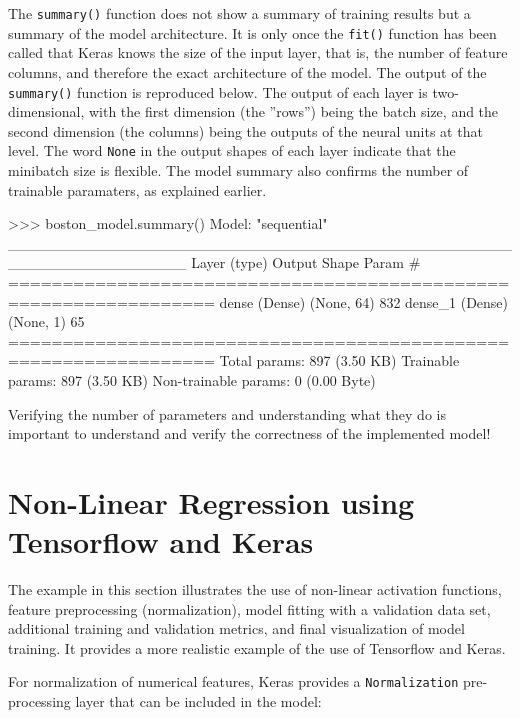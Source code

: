 \begin{withcode}
The \texttt{summary()} function does not show a summary of training results but a summary of the model architecture. It is only once the \texttt{fit()} function has been called that Keras knows the size of the input layer, that is, the number of feature columns, and therefore the exact architecture of the model. The output of the \texttt{summary()} function is reproduced below. The output of each layer is two-dimensional, with the first dimension (the ''rows'') being the batch size, and the second dimension (the columns) being the outputs of the neural units at that level. The word \texttt{None} in the output shapes of each layer indicate that the minibatch size is flexible. The model summary also confirms the number of trainable paramaters, as explained earlier.

\begin{textcode}
>>> boston_model.summary()
Model: "sequential"
_________________________________________________________________
 Layer (type)                Output Shape              Param #   
=================================================================
 dense (Dense)               (None, 64)                832       
 dense_1 (Dense)             (None, 1)                 65        
=================================================================
Total params: 897 (3.50 KB)
Trainable params: 897 (3.50 KB)
Non-trainable params: 0 (0.00 Byte)
\end{textcode}

\begin{alertbox}
Verifying the number of parameters and understanding what they do is important to understand and verify the correctness of the implemented model!
\end{alertbox}

\section{Non-Linear Regression using Tensorflow and Keras}

The example in this section illustrates the use of non-linear activation functions, feature preprocessing (normalization), model fitting with a validation data set, additional training and validation metrics, and final visualization of model training. It provides a more realistic example of the use of Tensorflow and Keras. 

For normalization of numerical features, Keras provides a \texttt{Normalization} pre-processing layer that can be included in the model:


\end{withcode}
